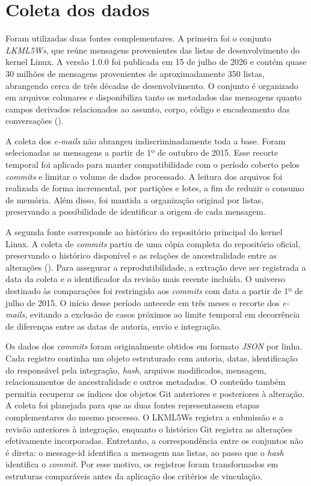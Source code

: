 \section{Coleta dos dados}
Foram utilizadas duas fontes complementares. A primeira foi o conjunto \textit{LKML5Ws}, que reúne mensagens provenientes das listas de desenvolvimento do kernel Linux. A versão 1.0.0 foi publicada em 15 de julho de 2026 e contém quase 30 milhões de mensagens provenientes de aproximadamente 350 listas, abrangendo cerca de três décadas de desenvolvimento. O conjunto é organizado em arquivos colunares e disponibiliza tanto os metadados das mensagens quanto campos derivados relacionados ao assunto, corpo, código e encadeamento das conversações (\cite{passos2026lkml5ws}).

A coleta dos \textit{e-mails} não abrangeu indiscriminadamente toda a base. Foram selecionadas as mensagens a partir de 1º de outubro de 2015. Esse recorte temporal foi aplicado para manter compatibilidade com o período coberto pelos \textit{commits} e limitar o volume de dados processado. A leitura dos arquivos foi realizada de forma incremental, por partições e lotes, a fim de reduzir o consumo de memória. Além disso, foi mantida a organização original por listas, preservando a possibilidade de identificar a origem de cada mensagem.

A segunda fonte corresponde ao histórico do repositório principal do kernel Linux. A coleta de \textit{commits} partiu de uma cópia completa do repositório oficial, preservando o histórico disponível e as relações de ancestralidade entre as alterações (\cite{torvalds_linux_source}). Para assegurar a reprodutibilidade, a extração deve ser registrada a data da coleta e o identificador da revisão mais recente incluída. O universo destinado às comparações foi restringido aos \textit{commits} com data a partir de 1º de julho de 2015. O início desse período antecede em três meses o recorte dos \textit{e-mails}, evitando a exclusão de casos próximos ao limite temporal em decorrência de diferenças entre as datas de autoria, envio e integração.

Os dados dos \textit{commits} foram originalmente obtidos em formato \textit{JSON} por linha. Cada registro continha um objeto estruturado com autoria, datas, identificação do responsável pela integração, \textit{hash}, arquivos modificados, mensagem, relacionamentos de ancestralidade e outros metadados. O conteúdo também permitia recuperar os índices dos objetos Git anteriores e posteriores à alteração. 
A coleta foi planejada para que as duas fontes representassem etapas complementares do mesmo processo. O LKML5Ws registra a submissão e a revisão anteriores à integração, enquanto o histórico Git registra as alterações efetivamente incorporadas. Entretanto, a correspondência entre os conjuntos não é direta: o message-id identifica a mensagem nas listas, ao passo que o \textit{hash} identifica o \textit{commit}. Por esse motivo, os registros foram transformados em estruturas comparáveis antes da aplicação dos critérios de vinculação.


